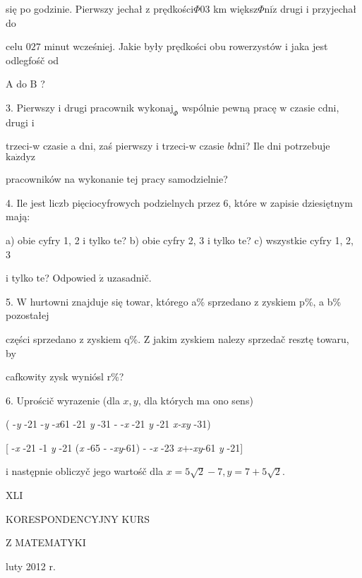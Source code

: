 \documentclass[a4paper,12pt]{article}
\begin{document}
się po godzinie. Pierwszy jechał $\mathrm{z}$ prędkości$\Phi 03$ km większ$\Phi \mathrm{n}\mathrm{i}\dot{\mathrm{z}}$ drugi $\mathrm{i}$ przyjechał do

celu $027$ minut wcześniej. Jakie były prędkości obu rowerzystów $\mathrm{i}$ jaka jest odlegfośč od

A do $\mathrm{B}$ ?

3. Pierwszy $\mathrm{i}$ drugi pracownik $\mathrm{w}\mathrm{y}\mathrm{k}\mathrm{o}\mathrm{n}\mathrm{a}\mathrm{j}_{\Phi}$ wspólnie pewną pracę $\mathrm{w}$ czasie $\mathrm{c} \mathrm{d}\mathrm{n}\mathrm{i}$, drugi $\mathrm{i}$

trzeci-w czasie a $\mathrm{d}\mathrm{n}\mathrm{i}$, zaś pierwszy $\mathrm{i}$ trzeci-w czasie $b\mathrm{d}\mathrm{n}\mathrm{i}$? Ile dni potrzebuje $\mathrm{k}\mathrm{a}\dot{\mathrm{z}}\mathrm{d}\mathrm{y}\mathrm{z}$

pracowników na wykonanie tej pracy samodzielnie?

4. Ile jest liczb pięciocyfrowych podzielnych przez 6, które $\mathrm{w}$ zapisie dziesiętnym mają:

a) obie cyfry 1, 2 $\mathrm{i}$ tylko $\mathrm{t}\mathrm{e}$? b) obie cyfry 2, 3 $\mathrm{i}$ tylko $\mathrm{t}\mathrm{e}$? c) wszystkie cyfry 1, 2, 3

$\mathrm{i}$ tylko $\mathrm{t}\mathrm{e}$? Odpowied $\acute{\mathrm{z}}$ uzasadnič.

5. $\mathrm{W}$ hurtowni znajduje się towar, którego a\% sprzedano $\mathrm{z}$ zyskiem p\%, a b\% pozostałej

części sprzedano $\mathrm{z}$ zyskiem q\%. $\mathrm{Z}$ jakim zyskiem nalezy sprzedač resztę towaru, by

cafkowity zysk wyniósl r\%?

6. Uprościč wyrazenie (dla $x, y$, dla których ma ono sens)

( -{\it y} -21 -{\it y} -{\it x}61 -21 {\it y} -31 - -{\it x} -21 {\it y} -21 {\it x-xy} -31)

[ -{\it x} -21 -1 {\it y} -21 ({\it x} -65 - -{\it xy}-61) - -{\it x} -23 {\it x}$+$-{\it xy}-61 {\it y} -21]

$\mathrm{i}$ następnie obliczyč jego wartośč dla $x=5\sqrt{2}-7, y=7+5\sqrt{2}.$





XLI

KORESPONDENCYJNY KURS

Z MATEMATYKI

luty 2012 r.
\end{document}
